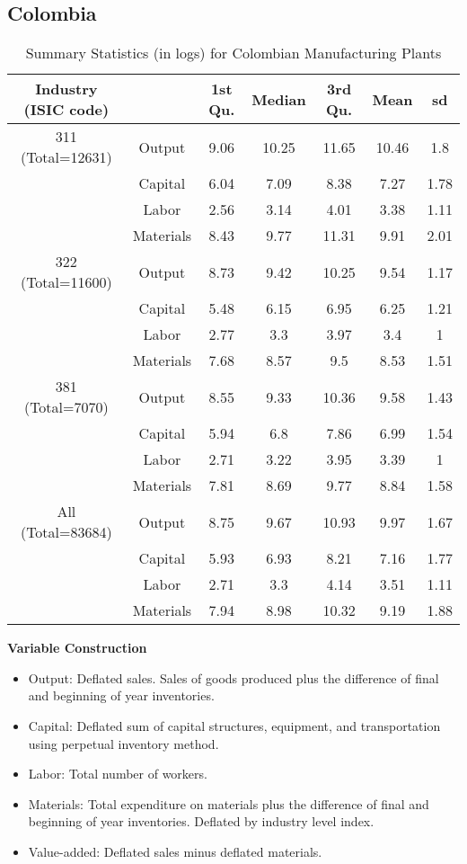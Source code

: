 \documentclass[12pt]{article}
\begin{document}
\begin{appendices}
\subsection{Colombia} \label{COLdata}

\begin{table}[H]
\centering
\caption{Summary Statistics (in logs) for Colombian Manufacturing Plants}
\small
\begin{tabular}{ccccccc}
  \hline\hline Industry (ISIC code) &   & 1st Qu. & Median & 3rd Qu. & Mean & sd \\ 
  \hline
311 (Total=12631) & Output & 9.06 & 10.25 & 11.65 & 10.46 & 1.8 \\ 
   & Capital & 6.04 & 7.09 & 8.38 & 7.27 & 1.78 \\ 
   & Labor & 2.56 & 3.14 & 4.01 & 3.38 & 1.11 \\ 
   & Materials & 8.43 & 9.77 & 11.31 & 9.91 & 2.01 \\ 
  322 (Total=11600) & Output & 8.73 & 9.42 & 10.25 & 9.54 & 1.17 \\ 
   & Capital & 5.48 & 6.15 & 6.95 & 6.25 & 1.21 \\ 
   & Labor & 2.77 & 3.3 & 3.97 & 3.4 & 1 \\ 
   & Materials & 7.68 & 8.57 & 9.5 & 8.53 & 1.51 \\ 
  381 (Total=7070) & Output & 8.55 & 9.33 & 10.36 & 9.58 & 1.43 \\ 
   & Capital & 5.94 & 6.8 & 7.86 & 6.99 & 1.54 \\ 
   & Labor & 2.71 & 3.22 & 3.95 & 3.39 & 1 \\ 
   & Materials & 7.81 & 8.69 & 9.77 & 8.84 & 1.58 \\ 
  All (Total=83684) & Output & 8.75 & 9.67 & 10.93 & 9.97 & 1.67 \\ 
   & Capital & 5.93 & 6.93 & 8.21 & 7.16 & 1.77 \\ 
   & Labor & 2.71 & 3.3 & 4.14 & 3.51 & 1.11 \\ 
   & Materials & 7.94 & 8.98 & 10.32 & 9.19 & 1.88 \\ 
   \hline
\end{tabular}
\label{COLsum}
\end{table}

\textbf{Variable Construction}
\begin{itemize}
	\item Output: Deflated sales. Sales of goods produced plus the difference of final and beginning of year inventories.
	\item Capital: Deflated sum of capital structures, equipment, and transportation using perpetual inventory method.
	\item Labor: Total number of workers.
	\item Materials: Total expenditure on materials plus the difference of final and beginning of year inventories. Deflated by industry level index.
	\item Value-added: Deflated sales minus deflated materials.
\end{itemize}


\end{appendices}
\end{document}
